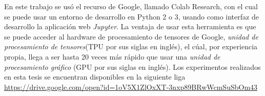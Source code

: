 \par En este trabajo se usó el recurso de Google, llamado Colab Research, con el cual se puede usar un entorno de desarrollo en Python 2 o 3, usando como interfaz de desarrollo la aplicación web \textit{Jupyter}. La ventaja de usar esta herramienta es que se puede acceder al hardware de procesamiento de tensores de Google, \textit{unidad de procesamiento de tensores}(TPU por sus siglas en inglés), el cúal, por experiencia propia, llega a ser hasta 20 veces más rápido que usar una \textit{unidad de procesamiento gráfico} (GPU por sus siglas en inglés). Los experimentos realizados en esta tesis se encuentran disponibles en la siguiente liga \href{ https://drive.google.com/open?id=1oV5X1ZlOxXT-3nxp89BRwWcmSuSbOm43}{https://drive.google.com/open?id=1oV5X1ZlOxXT-3nxp89BRwWcmSuSbOm43}